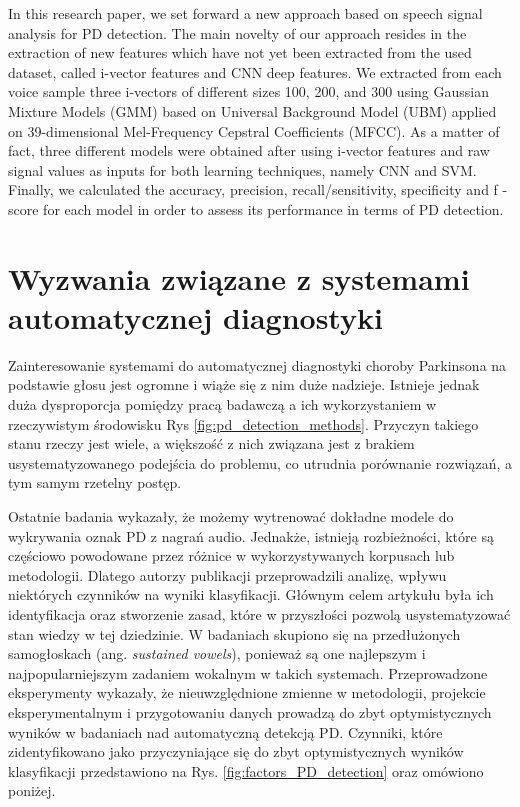 In this research paper, we set forward a new approach based on speech signal analysis for PD detection. The main novelty of our approach resides
in the extraction of new features which have not yet been extracted from the used dataset, called i-vector features and CNN
deep features. We extracted from each voice sample three i-vectors
of different sizes 100, 200, and 300 using Gaussian Mixture Models (GMM) based on Universal Background Model (UBM) applied
on 39-dimensional Mel-Frequency Cepstral Coefficients (MFCC). As
a matter of fact, three different models were obtained after using
i-vector features and raw signal values as inputs for both learning
techniques, namely CNN and SVM. Finally, we calculated the accuracy, precision, recall/sensitivity, specificity and f -score for each
model in order to assess its performance in terms of PD detection. \cite{2023_PD_voice}


\section{Wyzwania związane z systemami automatycznej diagnostyki}\label{sec:wyzwania}

Zainteresowanie systemami do automatycznej diagnostyki choroby Parkinsona na podstawie głosu jest ogromne i wiąże się z nim duże nadzieje.
Istnieje jednak duża dysproporcja pomiędzy pracą badawczą a ich wykorzystaniem w rzeczywistym środowisku Rys \ref{fig:pd_detection_methods}.
Przyczyn takiego stanu rzeczy jest wiele, a większość z nich związana jest z brakiem usystematyzowanego podejścia do problemu, co utrudnia porównanie
rozwiązań, a tym samym rzetelny postęp.

Ostatnie badania wykazały, że możemy wytrenować dokładne modele do wykrywania oznak PD z nagrań audio.
Jednakże, istnieją rozbieżności, które są częściowo powodowane przez różnice w
wykorzystywanych korpusach lub metodologii.
Dlatego autorzy publikacji \cite{SustainedVowelsProblems} przeprowadzili analizę, wpływu niektórych czynników na wyniki klasyfikacji.
Głównym celem artykułu była ich identyfikacja oraz stworzenie zasad, które w przyszłości pozwolą usystematyzować
stan wiedzy w tej dziedzinie.
W badaniach skupiono się na przedłużonych samogłoskach (ang. \emph{sustained vowels}), ponieważ są one najlepszym i najpopularniejszym zadaniem
wokalnym w takich systemach.
Przeprowadzone eksperymenty wykazały, że nieuwzględnione zmienne w metodologii, projekcie eksperymentalnym i
przygotowaniu danych prowadzą do zbyt optymistycznych wyników w badaniach nad automatyczną detekcją PD.
Czynniki, które zidentyfikowano jako przyczyniające się do zbyt optymistycznych wyników klasyfikacji
przedstawiono na Rys. \ref{fig:factors_PD_detection} oraz omówiono poniżej.


